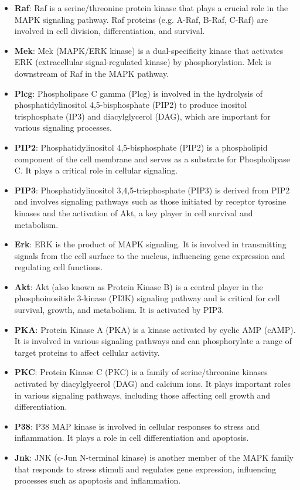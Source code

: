 \documentclass{article}
\begin{document}
\begin{itemize}
    \item \textbf{Raf}: Raf is a serine/threonine protein kinase that plays a crucial role in the MAPK signaling pathway. Raf proteins (e.g. A-Raf, B-Raf, C-Raf) are involved in cell division, differentiation, and survival.
    \item \textbf{Mek}: Mek (MAPK/ERK kinase) is a dual-specificity kinase that activates ERK (extracellular signal-regulated kinase) by phosphorylation. Mek is downstream of Raf in the MAPK pathway.
    \item \textbf{Plcg}: Phospholipase C gamma (Plcg) is involved in the hydrolysis of phosphatidylinositol 4,5-bisphosphate (PIP2) to produce inositol trisphosphate (IP3) and diacylglycerol (DAG), which are important for various signaling processes.
    \item \textbf{PIP2}: Phosphatidylinositol 4,5-bisphosphate (PIP2) is a phospholipid component of the cell membrane and serves as a substrate for Phospholipase C. It plays a critical role in cellular signaling.
    \item \textbf{PIP3}: Phosphatidylinositol 3,4,5-trisphosphate (PIP3) is derived from PIP2 and involves signaling pathways such as those initiated by receptor tyrosine kinases and the activation of Akt, a key player in cell survival and metabolism.
    \item \textbf{Erk}: ERK is the product of MAPK signaling. It is involved in transmitting signals from the cell surface to the nucleus, influencing gene expression and regulating cell functions.
    \item \textbf{Akt}: Akt (also known as Protein Kinase B) is a central player in the phosphoinositide 3-kinase (PI3K) signaling pathway and is critical for cell survival, growth, and metabolism. It is activated by PIP3.
    \item \textbf{PKA}: Protein Kinase A (PKA) is a kinase activated by cyclic AMP (cAMP). It is involved in various signaling pathways and can phosphorylate a range of target proteins to affect cellular activity.
    \item \textbf{PKC}: Protein Kinase C (PKC) is a family of serine/threonine kinases activated by diacylglycerol (DAG) and calcium ions. It plays important roles in various signaling pathways, including those affecting cell growth and differentiation.
    \item \textbf{P38}: P38 MAP kinase is involved in cellular responses to stress and inflammation. It plays a role in cell differentiation and apoptosis.
    \item \textbf{Jnk}: JNK (c-Jun N-terminal kinase) is another member of the MAPK family that responds to stress stimuli and regulates gene expression, influencing processes such as apoptosis and inflammation.
\end{itemize}
\end{document}
